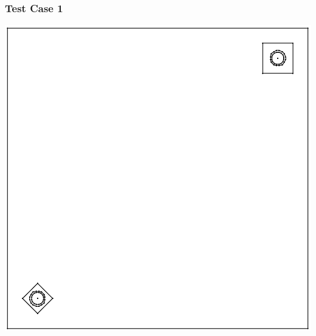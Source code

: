 \documentclass[compress]{beamer}
\begin{document}
\begin{frame}[t]\frametitle{Test Case 1}
\centering
\includegraphics[scale = 0.4]{figures/unbalanced_lattice-eps-converted-to.pdf}
\end{frame}
\end{document}
